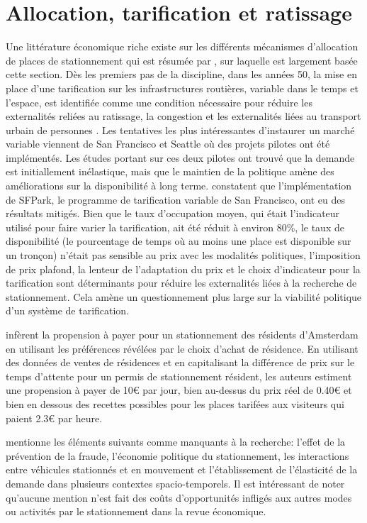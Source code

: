 \section{Allocation, tarification et ratissage}
Une littérature économique riche existe sur les différents mécanismes d'allocation de places de stationnement qui est résumée par \textcite{Inci:ReviewEconomics:2015}, sur laquelle est largement basée cette section. Dès les premiers pas de la discipline, dans les années 50, la mise en place d'une tarification sur les infrastructures routières, variable dans le temps et l'espace, est identifiée comme une condition nécessaire pour réduire les externalités reliées au ratissage, la congestion et les externalités liées au transport urbain de personnes \parencite{Vickrey:StatementJoint:1994}. Les tentatives les plus intéressantes d'instaurer un marché variable viennent de San Francisco et Seattle où des projets pilotes ont été implémentés. Les études portant sur ces deux pilotes ont trouvé que la demande est initiallement inélastique, mais que le maintien de la politique amène des améliorations sur la disponibilité à long terme. \textcite{Chatman:TheoryImplementation:2014} constatent que l'implémentation de SFPark, le programme de tarification variable de San Francisco, ont eu des résultats mitigés. Bien que le taux d'occupation moyen, qui était l'indicateur utilisé pour faire varier la tarification,  ait été réduit à environ 80\%, le taux de disponibilité (le pourcentage de temps où au moins une place est disponible sur un tronçon) n'était pas sensible au prix avec les modalités politiques, l'imposition de prix plafond, la lenteur de l'adaptation du prix et le choix d'indicateur pour la tarification sont déterminants pour réduire les externalités liées à la recherche de stationnement. Cela amène un questionnement plus large sur la viabilité politique d'un système de tarification.\par
\textcite{vanOmmeren:RealPrice:2011} infèrent la propension à payer pour un stationnement des résidents d'Amsterdam en utilisant les préférences révélées par le choix d'achat de résidence. En utilisant des données de ventes de résidences et en capitalisant la différence de prix sur le temps d'attente pour un permis de stationnement résident, les auteurs estiment une propension à payer de 10€ par jour, bien au-dessus du prix réel de 0.40€ et bien en dessous des recettes possibles pour les places tarifées aux visiteurs qui paient 2.3€ par heure.\par
\textcite{Inci:ReviewEconomics:2015} mentionne les éléments suivants comme manquants à la recherche: l'effet de la prévention de la fraude, l'économie politique du stationnement, les interactions entre véhicules stationnés et en mouvement et l'établissement de l'élasticité de la demande dans plusieurs contextes spacio-temporels. Il est intéressant de noter qu'aucune mention n'est fait des coûts d'opportunités infligés aux autres modes ou activités par le stationnement dans la revue économique.

